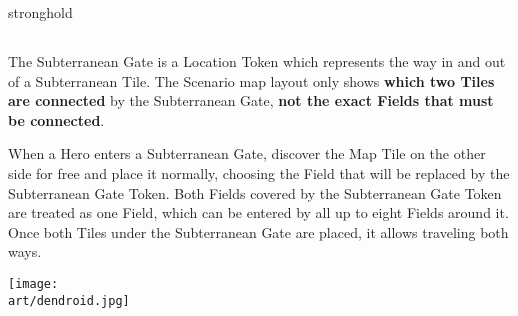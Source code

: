\begin{multicols*}{2}
\begin{expansion}{stronghold}
\bigskip
\begin{center}
  \begin{scriptsize}
    \centering
  \end{scriptsize}
\end{center}

\subsection*{}
The Subterranean Gate is a Location Token which represents the way in and out of a Subterranean Tile. The Scenario map layout only shows \textbf{which two Tiles are connected} by the Subterranean Gate, \textbf{not the exact Fields that must be connected}.\par
When a Hero enters a Subterranean Gate, discover the Map Tile on the other side for free and place it normally, choosing the Field that will be replaced by the Subterranean Gate Token.
Both Fields covered by the Subterranean Gate Token are treated as one Field, which can be entered by all up to eight Fields around it. Once both Tiles under the Subterranean Gate are placed, it allows traveling both ways.
\end{expansion}

\begin{center}
  \texttt{[image: \\art/dendroid.jpg]}
\end{center}

\end{multicols*}
